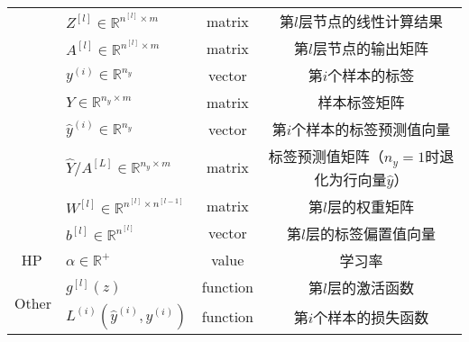 \begin{table}[htb!]
\begin{threeparttable}
\begin{tabular}{clcc}
                                    & $Z^{[l]} \in \mathbb{R}^{n^{[l]} \times {m}}$         & matrix               & 第$l$层节点的线性计算结果                                                         \\
                                    & $A^{[l]} \in \mathbb{R}^{n^{[l]} \times {m}}$         & matrix               & 第$l$层节点的输出矩阵                                                         \\
                                    & $y^{(i)} \in \mathbb{R}^{n_y}$                        & vector               & 第$i$个样本的标签                                                         \\
                                    & $Y \in {\mathbb{R}^{n_y \times m}}$                   & matrix               & 样本标签矩阵                                                           \\									
                                    & $\hat{y}^{(i)} \in \mathbb{R}^{n_y}$                  & vector               & 第$i$个样本的标签预测值向量                                                \\
                                    & $\hat{Y} / A^{[L]} \in {\mathbb{R}^{n_y \times m}}$   & matrix               & 标签预测值矩阵（$n_y=1$时退化为行向量$\hat{y}$）   						\\
                                    & $W^{[l]} \in \mathbb{R}^{n^{[l]} \times n^{[l-1]}}$   & matrix               & 第$l$层的权重矩阵                                                               \\
                                    & $b^{[l]} \in \mathbb{R}^{n^{[l]}}$                    & vector               & 第$l$层的标签偏置值向量                                                        \\
        \midrule
        \multirow{1}{*}{HP\,\tnote{a}}      & $\alpha \in \mathbb{R}^+$								& value                & 学习率                                                                        \\
        \midrule
        \multirow{4}{*}{Other}      & $g^{[l]}(z)$                                          & function             & 第$l$层的激活函数                                                         \\
                                    & $L^{(i)}(\hat{y}^{(i)}, y^{(i)})$                     & function             & 第$i$个样本的损失函数                                                         \\

\end{tabular}
\end{threeparttable}
\end{table}
